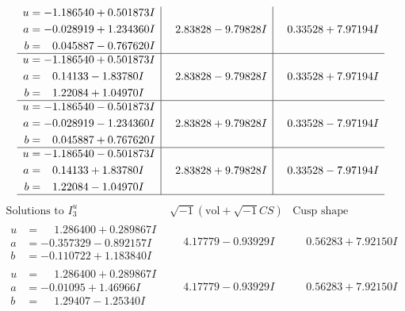 \documentclass[1p]{elsarticle_modified}
\theoremstyle{definition}
\newcommand{\I}{\sqrt{-1}}
\begin{document}
$$\begin{array}{c|c|c}
\begin{aligned}
u &= -1.186540 + 0.501873 I \\
a &= -0.028919 + 1.234360 I \\
b &= \phantom{-}0.045887 - 0.767620 I\end{aligned}
 & \phantom{-}2.83828 - 9.79828 I & \phantom{-}0.33528 + 7.97194 I \\ \hline\begin{aligned}
u &= -1.186540 + 0.501873 I \\
a &= \phantom{-}0.14133 - 1.83780 I \\
b &= \phantom{-}1.22084 + 1.04970 I\end{aligned}
 & \phantom{-}2.83828 - 9.79828 I & \phantom{-}0.33528 + 7.97194 I \\ \hline\begin{aligned}
u &= -1.186540 - 0.501873 I \\
a &= -0.028919 - 1.234360 I \\
b &= \phantom{-}0.045887 + 0.767620 I\end{aligned}
 & \phantom{-}2.83828 + 9.79828 I & \phantom{-}0.33528 - 7.97194 I \\ \hline\begin{aligned}
u &= -1.186540 - 0.501873 I \\
a &= \phantom{-}0.14133 + 1.83780 I \\
b &= \phantom{-}1.22084 - 1.04970 I\end{aligned}
 & \phantom{-}2.83828 + 9.79828 I & \phantom{-}0.33528 - 7.97194 I\\
 \hline 
 \end{array}$$\newpage$$\begin{array}{c|c|c}  
\text{Solutions to }I^u_{3}& \I (\text{vol} + \sqrt{-1}CS) & \text{Cusp shape}\\
 \hline 
\begin{aligned}
u &= \phantom{-}1.286400 + 0.289867 I \\
a &= -0.357329 - 0.892157 I \\
b &= -0.110722 + 1.183840 I\end{aligned}
 & \phantom{-}4.17779 - 0.93929 I & \phantom{-}0.56283 + 7.92150 I \\ \hline\begin{aligned}
u &= \phantom{-}1.286400 + 0.289867 I \\
a &= -0.01095 + 1.46966 I \\
b &= \phantom{-}1.29407 - 1.25340 I\end{aligned}
 & \phantom{-}4.17779 - 0.93929 I & \phantom{-}0.56283 + 7.92150 I \\ \hline\begin{aligned}

\end{aligned}
\end{array}$$
\end{document}
